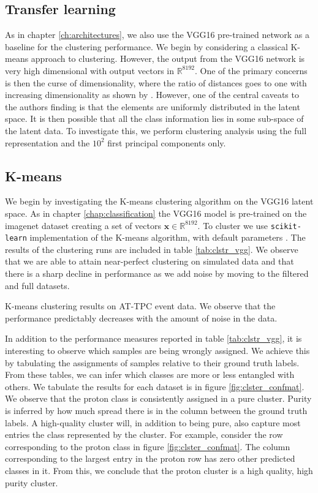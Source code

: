 \documentclass[preprint,12pt]{elsarticle}
\newcommand{\R}{\mathbb{R}}
\begin{document}
\subsection{Transfer learning}
As in chapter \ref{ch:architectures}, we also use the VGG16 pre-trained network as a baseline for the clustering performance. We begin by considering a classical K-means approach to clustering. However, the output from the VGG16 network is very high dimensional with output vectors in $\R^{8192}$. One of the primary concerns is then the curse of dimensionality, where the ratio of distances goes to one with increasing dimensionality as shown by \citet{Aggarwal}. However, one of the central caveats to the authors  finding is that the elements are uniformly distributed in the latent space. It is then possible that all the class information lies in some sub-space of the latent data. To investigate this, we perform clustering analysis using the full representation and the $10^2$ first principal components only. 

\subsection{K-means}

We begin by investigating the K-means clustering algorithm on the VGG16 latent space. As in chapter \ref{chap:classification} the VGG16 model is pre-trained on the imagenet dataset creating a set of vectors $\boldsymbol{x} \in \R^{8192}$. To cluster we use \lstinline{scikit-learn} implementation of the K-means algorithm, with default parameters \cite{Pedregosa2011}. The results of the clustering runs are included in table \ref{tab:clstr_vgg}. We observe that we are able to attain near-perfect clustering on simulated data and that there is a sharp decline in performance as we add noise by moving to the filtered and full datasets. 

\begin{table}[H]
\centering 
\caption[K-means on pre-trained model]{K-means clustering results on AT-TPC event data. We observe that the performance predictably decreases with the amount of noise in the data.}\label{tab:clstr_vgg}

\end{table}

In addition to the performance measures reported in table \ref{tab:clstr_vgg}, it is interesting to observe which samples are being wrongly assigned. We achieve this by tabulating the assignments of samples relative to their ground truth labels. From these tables, we can infer which classes are more or less entangled with others. We tabulate the results for each dataset is in figure \ref{fig:clster_confmat}. We observe that the proton class is consistently assigned in a pure cluster. Purity is inferred by how much spread there is in the column between the ground truth labels. A high-quality cluster will, in addition to being pure, also capture most entries the class represented by the cluster. For example, consider the row corresponding to the proton class in figure \ref{fig:clster_confmat}. The column corresponding to the largest entry in the proton row has zero other predicted classes in it. From this, we conclude that the proton cluster is a high quality, high purity cluster. 
\end{document}
